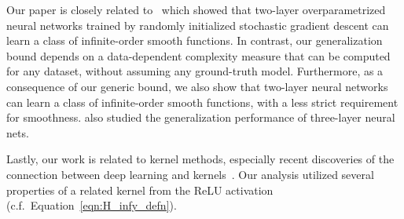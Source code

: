 





Our paper is closely related to~\citep{allen2018learning} which showed that two-layer overparametrized neural networks trained by randomly initialized stochastic gradient descent can learn a class of infinite-order smooth functions. %
In contrast, our generalization bound depends on a data-dependent complexity measure that can be computed for any dataset, without assuming any ground-truth model.
Furthermore, as a consequence of our generic bound, we also show that two-layer neural networks can learn a class of infinite-order smooth functions, with a less strict requirement for smoothness.
\citet{allen2018learning} also studied the generalization performance of three-layer neural nets.



Lastly, our work is related to kernel methods, especially recent discoveries of the connection between deep learning and kernels~\citep{jacot2018neural,chizat2018note,daniely2016toward,daniely2017sgd}.
Our analysis utilized several properties of a related kernel from the ReLU activation (c.f.~Equation~\eqref{eqn:H_infy_defn}). 


